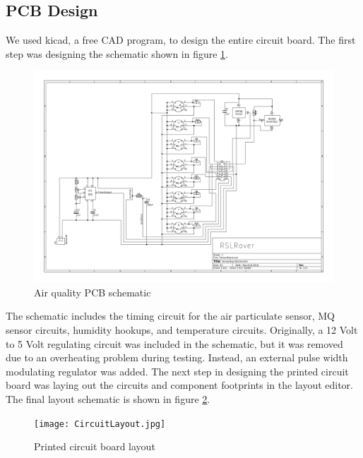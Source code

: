 \subsection{PCB Design}

We used kicad, a free CAD program, to design the entire circuit board. The first step was designing the schematic shown in figure \ref{fig:CircuitSchematic}.

\begin{figure}[H]
	\centerline{\includegraphics[width=1\linewidth]{images/SensorSchematic.pdf}}
	\caption{Air quality PCB schematic}
	\label{fig:CircuitSchematic}
\end{figure}

The schematic includes the timing circuit for the air particulate sensor, MQ sensor circuits, humidity hookups, and temperature circuits. Originally, a 12 Volt to 5 Volt regulating circuit was included in the schematic, but it was removed due to an overheating problem during testing. Instead, an external pulse width modulating regulator was added. The next step in designing the printed circuit board was laying out the circuits and component footprints in the layout editor. The final layout schematic is shown in figure \ref{fig:CircuitLayout}.

\begin{figure}[H]
	\centering
	\texttt{[image: CircuitLayout.jpg]}
	\caption{Printed circuit board layout}
	\label{fig:CircuitLayout}
\end{figure}

